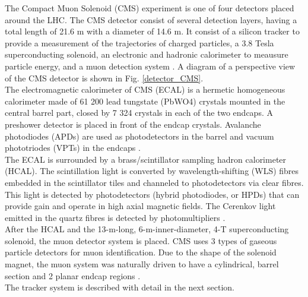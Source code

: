 The Compact Muon Solenoid (CMS) experiment is one of four detectors placed  around the LHC. The CMS detector consist of several detection layers, having a total length of 21.6 m with a diameter of 14.6 m. It consist of a silicon tracker to provide a measurement of the trajectories of charged particles, a 3.8 Tesla superconducting solenoid, an electronic and hadronic calorimeter to meausure particle energy, and a muon detection system \cite{CMS_Exp_2008}. A diagram of a perspective view of the CMS detector is shown in Fig. \ref{detector_CMS}.\\
The electromagnetic calorimeter of CMS (ECAL) is a hermetic homogeneous calorimeter made of 61 200 lead tungstate (PbWO4) crystals mounted in the central barrel part, closed by 7 324 crystals in each of the two endcaps. A preshower detector is placed in front of the endcap crystals. Avalanche photodiodes (APDs) are used as photodetectors in the barrel and vacuum phototriodes (VPTs) in the endcaps \cite{CMS_Exp_2008}.\\
The ECAL is surrounded by a brass/scintillator sampling hadron calorimeter (HCAL). The scintillation light is converted by wavelength-shifting (WLS) fibres embedded in the scintillator tiles and channeled to photodetectors via clear fibres. This light is detected by photodetectors (hybrid photodiodes, or HPDs) that can provide gain and operate in high axial magnetic fields. The Cerenkov light emitted in the quartz fibres is detected by photomultipliers \cite{CMS_Exp_2008}.\\ 
After the HCAL and the 13-m-long, 6-m-inner-diameter, 4-T superconducting solenoid, the muon detector system is placed. CMS uses 3 types of gaseous particle detectors for muon identification. Due to the shape of the solenoid magnet, the muon system was naturally driven to have a cylindrical, barrel section and 2 planar endcap regions \cite{CMS_Exp_2008}.\\
The tracker system is described with detail in the next section.\\
